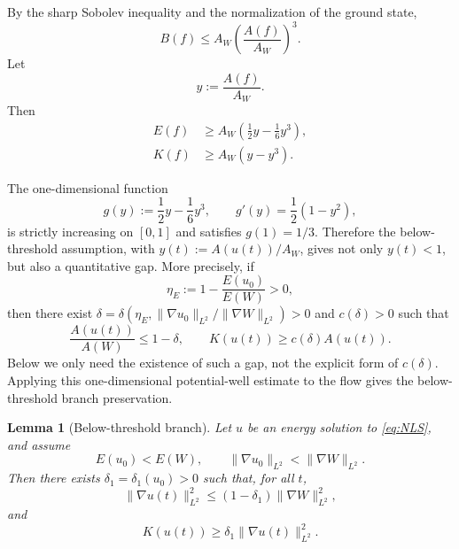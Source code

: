 \documentclass[smallextended,envcountsect,nospthms]{svjour3}
\numberwithin{equation}{section}
\theoremstyle{spbreak}
\newtheorem{lemma}[theorem]{Lemma}
\theoremstyle{spdefbreak}
\theoremstyle{spdefbreak}
\begin{document}
By the sharp Sobolev inequality and the normalization of the ground state,
\begin{equation*}
  B(f)\le A_W\left(\frac{A(f)}{A_W}\right)^3.
\end{equation*}
Let
\begin{equation*}
  y:=\frac{A(f)}{A_W}.
\end{equation*}
Then
\begin{align}
  E(f)&\ge A_W\left(\frac12y-\frac16y^3\right),\label{eq:E-lower-y}\\
  K(f)&\ge A_W(y-y^3).\label{eq:K-lower-y}
\end{align}

The one-dimensional function
\begin{equation*}
  g(y):=\frac12y-\frac16y^3,
  \qquad g'(y)=\frac12(1-y^2),
\end{equation*}
is strictly increasing on $[0,1]$ and satisfies $g(1)=1/3$. Therefore the below-threshold assumption, with $y(t):=A(u(t))/A_W$, gives not only $y(t)<1$, but also a quantitative gap. More precisely, if
\begin{equation*}
  \eta_E:=1-\frac{E(u_0)}{E(W)}>0,
\end{equation*}
then there exist $\delta=\delta(\eta_E,\|\nabla u_0\|_{L^2}/\|\nabla W\|_{L^2})>0$ and $c(\delta)>0$ such that
\begin{equation*}
  \frac{A(u(t))}{A(W)}\le1-\delta,
  \qquad K(u(t))\ge c(\delta)A(u(t)).
\end{equation*}
Below we only need the existence of such a gap, not the explicit form of $c(\delta)$. Applying this one-dimensional potential-well estimate to the flow gives the below-threshold branch preservation.

\begin{lemma}[Below-threshold branch]\label{lem:coercivity-branch}
Let $u$ be an energy solution to \eqref{eq:NLS}, and assume
\begin{equation*}
  E(u_0)<E(W),
  \qquad \|\nabla u_0\|_{L^2}<\|\nabla W\|_{L^2}.
\end{equation*}
Then there exists $\delta_1=\delta_1(u_0)>0$ such that, for all $t$,
\begin{equation*}
  \|\nabla u(t)\|_{L^2}^2\le(1-\delta_1)\|\nabla W\|_{L^2}^2,
\end{equation*}
and
\begin{equation}\label{eq:K-coercive-gradient}
  K(u(t))\ge\delta_1\|\nabla u(t)\|_{L^2}^2.
\end{equation}
\end{lemma}
\end{document}
